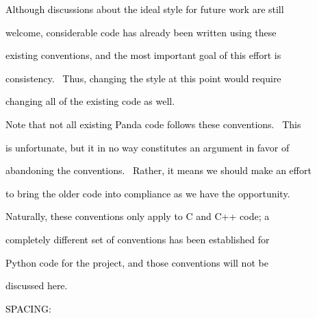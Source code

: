 \documentclass[a4paper]{article}
\newcommand\textstyleOOoComputerKeyWord[1]{\textrm{\textcolor[rgb]{0.0,0.0,0.5019608}{#1}}}
\begin{document}
{\color{black}
\textstyleOOoComputerKeyWord{\textcolor{black}{Although discussions about the ideal style for future work are still}}}

{\color{black}
\textstyleOOoComputerKeyWord{\textcolor{black}{welcome, considerable code has already been written using these}}}

{\color{black}
\textstyleOOoComputerKeyWord{\textcolor{black}{existing conventions, and the most important goal of this effort is}}}

{\color{black}
\textstyleOOoComputerKeyWord{\textcolor{black}{consistency. \ Thus, changing the style at this point would require}}}

{\color{black}
\textstyleOOoComputerKeyWord{\textcolor{black}{changing all of the existing code as well.}}}


\bigskip

{\color{black}
\textstyleOOoComputerKeyWord{\textcolor{black}{Note that not all existing Panda code follows these conventions.
\ This}}}

{\color{black}
\textstyleOOoComputerKeyWord{\textcolor{black}{is unfortunate, but it in no way constitutes an argument in favor of}}}

{\color{black}
\textstyleOOoComputerKeyWord{\textcolor{black}{abandoning the conventions. \ Rather, it means we should make an
effort}}}

{\color{black}
\textstyleOOoComputerKeyWord{\textcolor{black}{to bring the older code into compliance as we have the opportunity.}}}


\bigskip

\clearpage
\bigskip

{\color{black}
\textstyleOOoComputerKeyWord{\textcolor{black}{Naturally, these conventions only apply to C and C++ code; a}}}

{\color{black}
\textstyleOOoComputerKeyWord{\textcolor{black}{completely different set of conventions has been established for}}}

{\color{black}
\textstyleOOoComputerKeyWord{\textcolor{black}{Python code for the project, and those conventions will not be}}}

{\color{black}
\textstyleOOoComputerKeyWord{\textcolor{black}{discussed here.}}}


\bigskip


\bigskip

{\color{black}
\textstyleOOoComputerKeyWord{\textcolor{black}{SPACING:}}}


\bigskip
\end{document}
